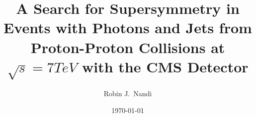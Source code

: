 \documentclass[a4paper]{report}
\begin{document}
\title{A Search for Supersymmetry in Events with Photons and Jets from 
Proton-Proton Collisions at $\sqrt{s} = 7 \unit{TeV}$ with the CMS Detector}
\author{Robin J.\ Nandi}
\date{\today}

\maketitle

\tableofcontents

\listoffigures

\listoftables





















%
\end{document}
